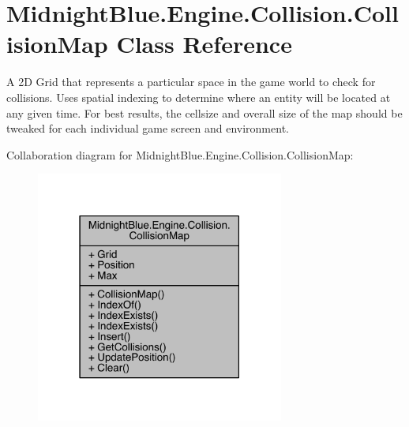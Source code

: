 \hypertarget{class_midnight_blue_1_1_engine_1_1_collision_1_1_collision_map}{}\section{Midnight\+Blue.\+Engine.\+Collision.\+Collision\+Map Class Reference}
\label{class_midnight_blue_1_1_engine_1_1_collision_1_1_collision_map}


A 2D Grid that represents a particular space in the game world to check for collisions. Uses spatial indexing to determine where an entity will be located at any given time. For best results, the cellsize and overall size of the map should be tweaked for each individual game screen and environment.  




Collaboration diagram for Midnight\+Blue.\+Engine.\+Collision.\+Collision\+Map\+:
\nopagebreak
\begin{figure}[H]
\begin{center}
\leavevmode
\includegraphics[width=231pt]{class_midnight_blue_1_1_engine_1_1_collision_1_1_collision_map__coll__graph}
\end{center}
\end{figure}
